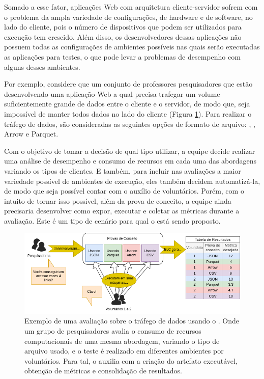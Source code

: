 \documentclass[12pt]{tcc}
\begin{document}
	Somado a esse fator, aplicações Web com arquitetura cliente-servidor sofrem com o problema da ampla variedade de configurações, de hardware e de software, no lado do cliente, pois o número de dispositivos que podem ser utilizados para execução tem crescido. Além disso, os desenvolvedores dessas aplicações não possuem todas as configurações de ambientes possíveis nas quais serão executadas as aplicações para testes, o que pode levar a problemas de desempenho com alguns desses ambientes. 

	Por exemplo, considere que um conjunto de professores pesquisadores que estão desenvolvendo uma aplicação Web a qual precisa trafegar um volume suficientemente grande de dados entre o cliente e o servidor, de modo que, seja impossível de manter todos dados no lado do cliente (Figura \ref{fig:exemplo-tipo-de-dado}). Para realizar o tráfego de dados, são consideradas as seguintes opções de formato de arquivo: , , Arrow e Parquet. 

	Com o objetivo de tomar a decisão de qual tipo utilizar, a equipe decide realizar uma análise de desempenho e consumo de recursos em cada uma das abordagens variando os tipos de clientes. E também, para incluir nas avaliações a maior variedade possível de ambientes de execução, eles também decidem automatizá-la, de modo que seja possível contar com o auxílio de voluntários. Porém, com o intuito de tornar isso possível, além da prova de conceito, a equipe ainda precisaria desenvolver como expor, executar e coletar as métricas durante a avaliação. Este é um tipo de cenário para qual o  está sendo proposto. 

	\begin{figure}[!ht]
		\centering
		\includegraphics[width=\textwidth]{figures/exemplo-tipo-de-dado.png}
		\caption[Exemplo de uma avaliação usando o ELC]{Exemplo de uma avaliação sobre o tráfego de dados usando o . Onde um grupo de pesquisadores avalia o consumo de recursos computacionais de uma mesma abordagem, variando o tipo de arquivo usado, e o teste é realizado em diferentes ambientes por voluntários. Para tal, o  auxilia com a criação do artefato executável, obtenção de métricas e consolidação de resultados.}
		\label{fig:exemplo-tipo-de-dado}
	\end{figure}
\end{document}
